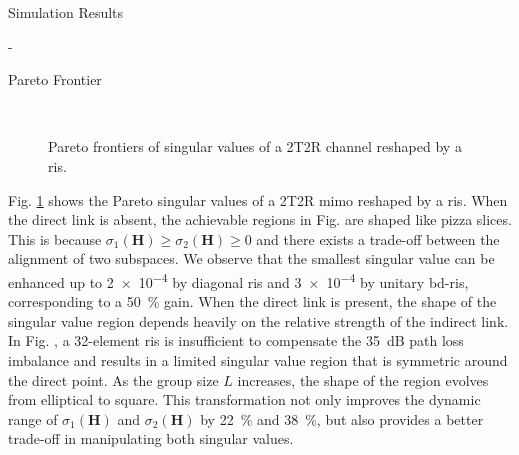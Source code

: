 \begin{section}{Simulation Results}
	\begin{subsection}{-}
		\begin{subsubsection}{Pareto Frontier}
			\begin{figure}[H]
				\centering
				\\
				\caption{Pareto frontiers of singular values of a 2T2R channel reshaped by a \gls{ris}.}
				\label{fg:singular_pareto}
			\end{figure}
			Fig. \ref{fg:singular_pareto} shows the Pareto singular values of a 2T2R \gls{mimo} reshaped by a \gls{ris}.
			When the direct link is absent, the achievable regions in Fig.  are shaped like pizza slices.
			This is because $\sigma_1(\mathbf{H}) \ge \sigma_2(\mathbf{H}) \ge 0$ and there exists a trade-off between the alignment of two subspaces.
			We observe that the smallest singular value can be enhanced up to \num{2e-4} by diagonal \gls{ris} and \num{3e-4} by unitary \gls{bd}-\gls{ris}, corresponding to a \qty{50}{\percent} gain.
			When the direct link is present, the shape of the singular value region depends heavily on the relative strength of the indirect link.
			In Fig. , a 32-element \gls{ris} is insufficient to compensate the \qty{35}{dB} path loss imbalance and results in a limited singular value region that is symmetric around the direct point.
			As the group size $L$ increases, the shape of the region evolves from elliptical to square.
			This transformation not only improves the dynamic range of $\sigma_1(\mathbf{H})$ and $\sigma_2(\mathbf{H})$ by \qty{22}{\percent} and \qty{38}{\percent}, but also provides a better trade-off in manipulating both singular values.

\end{subsubsection}
\end{subsection}
\end{section}
